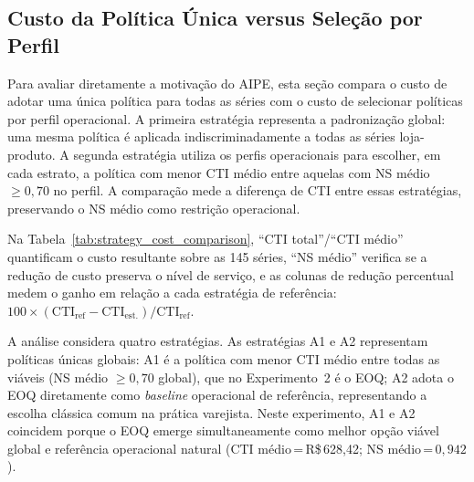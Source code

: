 \subsection{Custo da Política Única versus Seleção por Perfil}
\label{sec:custo_politica_unica_vs_perfil}

Para avaliar diretamente a motivação do AIPE, esta seção compara o custo de adotar uma única política para todas as séries com o custo de selecionar políticas por perfil operacional. A primeira estratégia representa a padronização global: uma mesma política é aplicada indiscriminadamente a todas as séries loja-produto. A segunda estratégia utiliza os perfis operacionais para escolher, em cada estrato, a política com menor CTI médio entre aquelas com NS médio $\geq 0{,}70$ no perfil. A comparação mede a diferença de CTI entre essas estratégias, preservando o NS médio como restrição operacional.

Na Tabela~\ref{tab:strategy_cost_comparison}, ``CTI total''/``CTI médio'' quantificam o custo resultante sobre as 145 séries, ``NS médio'' verifica se a redução de custo preserva o nível de serviço, e as colunas de redução percentual medem o ganho em relação a cada estratégia de referência: $100 \times (\mathrm{CTI}_{\text{ref}} - \mathrm{CTI}_{\text{est.}}) / \mathrm{CTI}_{\text{ref}}$.





A análise considera quatro estratégias. As estratégias A1 e A2 representam políticas únicas globais: A1 é a política com menor CTI médio entre todas as viáveis (NS médio $\geq 0{,}70$ global), que no Experimento~2 é o EOQ; A2 adota o EOQ diretamente como \textit{baseline} operacional de referência, representando a escolha clássica comum na prática varejista. Neste experimento, A1 e A2 coincidem porque o EOQ emerge simultaneamente como melhor opção viável global e referência operacional natural (CTI médio\,=\,R\$\,628,42; NS médio\,=\,$0{,}942$).

